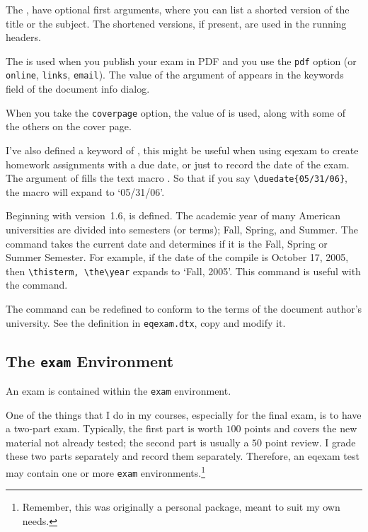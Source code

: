 \documentclass{article}
\def\PDF{PDF}\def\URL{URL}
\begin{document}
The ,  have optional first arguments, where
you can list a shorted version of the title or the subject. The
shortened versions, if present, are used in the running headers.

The  is used when you publish your exam in {\PDF} and
you use the \texttt{pdf} option (or \texttt{online}, \texttt{links},
\texttt{email}). The value of the argument of  appears
in the keywords field of the document info dialog.

When you take the \texttt{coverpage} option, the value of
 is used, along with some of the others on the
cover page.

I've also defined a keyword of , this might be useful
when using \textsf{eqexam} to create homework assignments with a
due date, or just to record the date of the exam. The argument of  fills the text macro
. So that if you say \verb|\duedate{05/31/06}|, the macro
 will expand to `05/31/06'.

\newtopic Beginning with version~1.6,  is defined.
The academic year of many American universities are divided into semesters
(or terms); Fall, Spring, and Summer.  The command  takes the current
date and determines if it is the Fall, Spring or Summer Semester. For example,
if the date of the compile is October 17, 2005, then \verb!\thisterm, \the\year!
expands to `Fall, 2005'.  This command is useful with the  command.

The command  can be redefined to conform to the terms
of the document author's university. See the definition in
\texttt{eqexam.dtx}, copy and modify it.

\subsection{The \texttt{exam} Environment}\label{exam}

An exam is contained within the \texttt{exam} environment.

One of the things that I do in my courses, especially for the
final exam, is to have a two-part exam. Typically, the first part
is worth $100$ points and covers the new material not already
tested; the second part is usually a $50$ point review.  I grade
these two parts separately and record them separately. Therefore,
an \textsf{eqexam} test may contain one or more \texttt{exam}
environments.\footnote{Remember, this was originally a personal
package, meant to suit my own needs.}
\end{document}
